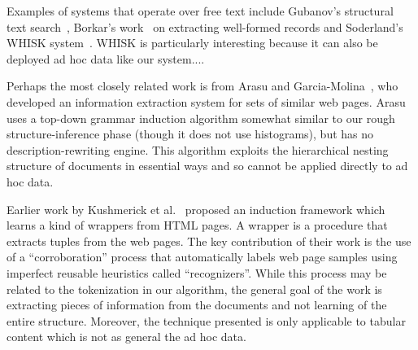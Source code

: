 
Examples of systems that operate over free text include
Gubanov's structural text search~\cite{gubanov+:structural-text-search},
Borkar's work~\cite{borkar+:text-segmentation} on extracting well-formed
records and 
Soderland's WHISK system~\cite{soderland:whisk}.  WHISK is particularly
interesting because it can also be deployed ad hoc data like our system....

Perhaps the most closely related work is from Arasu and 
Garcia-Molina~\cite{arasu+:sigmod03}, who developed an information
extraction system for sets of similar web pages.  
Arasu uses a top-down grammar induction
algorithm somewhat similar to our rough structure-inference phase
(though it does not use histograms),
but has no description-rewriting engine.  
This algorithm exploits the hierarchical nesting
structure of \xml{} documents in essential ways
and so cannot be applied directly to ad hoc data.  

Earlier work by Kushmerick et al.~\cite{KushmerickWD97:Wrapper} 
proposed an
induction framework which learns a kind of wrappers from
HTML pages. A wrapper is a procedure that extracts tuples from
the web pages. The key contribution of their work is 
the use of a ``corroboration'' process that automatically labels
web page samples using imperfect reusable heuristics called 
``recognizers''. While this process may be related to the
tokenization in our algorithm, the general goal of the work
is extracting pieces of information from the documents and not
learning of the entire structure. Moreover, the technique presented
is only applicable to tabular content which is not
as general the ad hoc data. 

